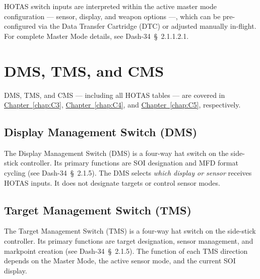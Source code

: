 \documentclass[11pt, a4paper, twoside]{report}
\newcommand{\dashref}[1]{Dash-34~\S~#1}
\newcommand{\chapref}[1]{\hyperref[#1]{Chapter~\ref*{#1}}}
\begin{document}
HOTAS switch inputs are interpreted within the active master mode configuration --- sensor, display, and weapon options ---, which can be pre-configured via the Data Transfer Cartridge (DTC) or adjusted manually in-flight. For complete Master Mode details, see \dashref{2.1.1.2.1}.

\section{DMS, TMS, and CMS}
\label{sec:C2-S3}

DMS, TMS, and CMS — including all HOTAS tables — are covered in \chapref{chap:C3}, \chapref{chap:C4}, and \chapref{chap:C5}, respectively.

\subsection{Display Management Switch (DMS)}
\label{sec:C2-S3-S1}

The Display Management Switch (DMS) is a four-way hat switch on the side-stick controller. Its primary functions are SOI designation and MFD format cycling (see \dashref{2.1.5}). The DMS selects \textit{which display or sensor} receives HOTAS inputs. It does not designate targets or control sensor modes.

\subsection{Target Management Switch (TMS)}
\label{sec:C2-S3-S2}

The Target Management Switch (TMS) is a four-way hat switch on the side-stick controller. Its primary functions are target designation, sensor management, and markpoint creation (see \dashref{2.1.5}). The function of each TMS direction depends on the Master Mode, the active sensor mode, and the current SOI display.

\end{document}
